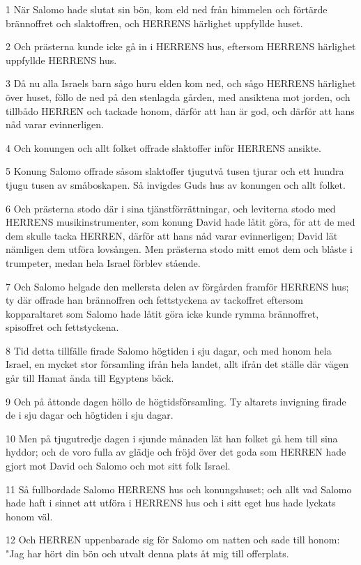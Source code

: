 \par 1 När Salomo hade slutat sin bön, kom eld ned från himmelen och förtärde brännoffret och slaktoffren, och HERRENS härlighet uppfyllde huset.
\par 2 Och prästerna kunde icke gå in i HERRENS hus, eftersom HERRENS härlighet uppfyllde HERRENS hus.
\par 3 Då nu alla Israels barn sågo huru elden kom ned, och sågo HERRENS härlighet över huset, föllo de ned på den stenlagda gården, med ansiktena mot jorden, och tillbådo HERREN och tackade honom, därför att han är god, och därför att hans nåd varar evinnerligen.
\par 4 Och konungen och allt folket offrade slaktoffer inför HERRENS ansikte.
\par 5 Konung Salomo offrade såsom slaktoffer tjugutvå tusen tjurar och ett hundra tjugu tusen av småboskapen. Så invigdes Guds hus av konungen och allt folket.
\par 6 Och prästerna stodo där i sina tjänstförrättningar, och leviterna stodo med HERRENS musikinstrumenter, som konung David hade låtit göra, för att de med dem skulle tacka HERREN, därför att hans nåd varar evinnerligen; David lät nämligen dem utföra lovsången. Men prästerna stodo mitt emot dem och blåste i trumpeter, medan hela Israel förblev stående.
\par 7 Och Salomo helgade den mellersta delen av förgården framför HERRENS hus; ty där offrade han brännoffren och fettstyckena av tackoffret eftersom kopparaltaret som Salomo hade låtit göra icke kunde rymma brännoffret, spisoffret och fettstyckena.
\par 8 Tid detta tillfälle firade Salomo högtiden i sju dagar, och med honom hela Israel, en mycket stor församling ifrån hela landet, allt ifrån det ställe där vägen går till Hamat ända till Egyptens bäck.
\par 9 Och på åttonde dagen höllo de högtidsförsamling. Ty altarets invigning firade de i sju dagar och högtiden i sju dagar.
\par 10 Men på tjugutredje dagen i sjunde månaden lät han folket gå hem till sina hyddor; och de voro fulla av glädje och fröjd över det goda som HERREN hade gjort mot David och Salomo och mot sitt folk Israel.
\par 11 Så fullbordade Salomo HERRENS hus och konungshuset; och allt vad Salomo hade haft i sinnet att utföra i HERRENS hus och i sitt eget hus hade lyckats honom väl.
\par 12 Och HERREN uppenbarade sig för Salomo om natten och sade till honom: "Jag har hört din bön och utvalt denna plats åt mig till offerplats.
